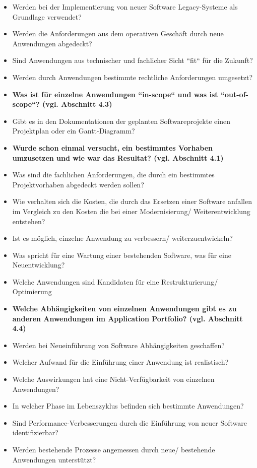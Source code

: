 \begin{itemize}
\item Werden bei der Implementierung von neuer Software Legacy-Systeme als Grundlage verwendet?
\item Werden die Anforderungen aus dem operativen Geschäft durch neue Anwendungen abgedeckt?
\item Sind Anwendungen aus technischer und fachlicher Sicht ``fit`` für die Zukunft?
\item Werden durch Anwendungen bestimmte rechtliche Anforderungen umgesetzt?
\item {\bf Was ist für einzelne Anwendungen ``in-scope`` und was ist ``out-of-scope``? (vgl. Abschnitt 4.3)}
\item Gibt es in den Dokumentationen der geplanten Softwareprojekte einen Projektplan oder ein Gantt-Diagramm?
\item {\bf Wurde schon einmal versucht, ein bestimmtes Vorhaben umzusetzen und wie war das Resultat? (vgl. Abschnitt 4.1)}
\item Was sind die fachlichen Anforderungen, die durch ein bestimmtes Projektvorhaben abgedeckt werden sollen?
\item Wie verhalten sich die Kosten, die durch das Ersetzen einer Software anfallen im Vergleich zu den Kosten die bei einer Modernisierung/ Weiterentwicklung entstehen?
\item Ist es möglich, einzelne Anwendung zu verbessern/ weiterzuentwickeln?
\item Was spricht für eine Wartung einer bestehenden Software, was für eine Neuentwicklung?
\item Welche Anwendungen sind Kandidaten für eine Restrukturierung/ Optimierung
\item {\bf Welche Abhängigkeiten von einzelnen Anwendungen gibt es zu anderen Anwendungen im Application Portfolio? (vgl. Abschnitt 4.4)}
\item Werden bei Neueinführung von Software Abhängigkeiten geschaffen?
\item Welcher Aufwand für die Einführung einer Anwendung ist realistisch?
\item Welche Auswirkungen hat eine Nicht-Verfügbarkeit von einzelnen Anwendungen?
\item In welcher Phase im Lebenszyklus befinden sich bestimmte Anwendungen?
\item Sind Performance-Verbesserungen durch die Einführung von neuer Software identifizierbar?
\item Werden bestehende Prozesse angemessen durch neue/ bestehende Anwendungen unterstützt?

\end{itemize}
